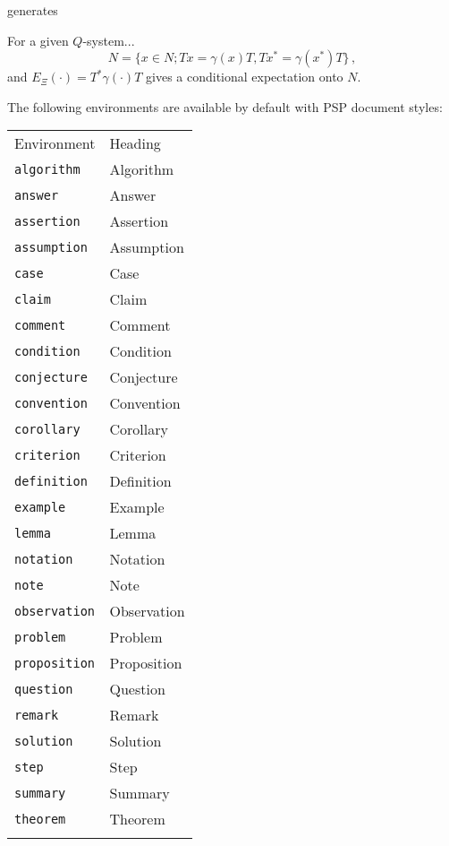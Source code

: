\noindent generates

\begin{theorem}[Longo, 1998]
For a given $Q$-system...
\[
N = \{x \in N; T x = \gamma (x) T, T x^* = \gamma (x^*) T\}\,,
\]
and $E_\Xi (\cdot) = T^* \gamma (\cdot) T$ gives a conditional
expectation onto $N$.
\end{theorem}

The following environments are available by default with PSP
document styles:

\begin{center}
{\tablefont
\begin{tabular}{ll}
\toprule Environment & Heading\\\colrule
\verb|algorithm| & Algorithm\\
\verb|answer| & Answer\\
\verb|assertion| & Assertion\\
\verb|assumption| & Assumption\\
\verb|case| & Case\\
\verb|claim| & Claim\\
\verb|comment| & Comment\\
\verb|condition| & Condition\\
\verb|conjecture| & Conjecture\\
\verb|convention| & Convention\\
\verb|corollary| & Corollary\\
\verb|criterion| & Criterion\\
\verb|definition| & Definition\\
\verb|example| & Example\\
\verb|lemma| & Lemma\\
\verb|notation| & Notation\\
\verb|note| & Note\\
\verb|observation| & Observation\\
\verb|problem| & Problem\\
\verb|proposition| & Proposition\\
\verb|question| & Question\\
\verb|remark| & Remark\\
\verb|solution| & Solution\\
\verb|step| & Step\\
\verb|summary| & Summary\\
\verb|theorem| & Theorem\\\botrule
\end{tabular}}\label{theo}
\end{center}

